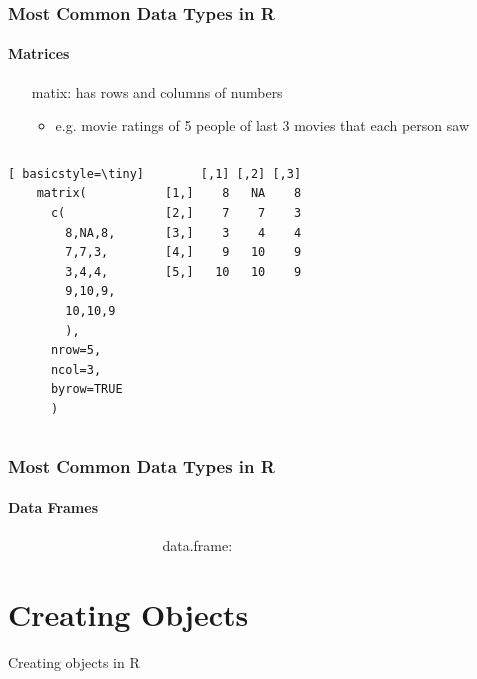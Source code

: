 \begin{frame}[fragile]
	\frametitle{Most Common Data Types in R}
	\framesubtitle{Matrices}

	\begin{itemize}
		\item[matix:] has rows and columns of numbers
			\begin{itemize}
				\item e.g. movie ratings of 5 people of last 3 movies that each person saw 
			\end{itemize}
		\end{itemize}

   \begin{columns}
     	\begin{center}
		\begin{lstlisting}[ basicstyle=\tiny]
	matrix(
	  c(
	    8,NA,8,
	    7,7,3,
		3,4,4,
		9,10,9,
		10,10,9
		),
	  nrow=5,
	  ncol=3,
	  byrow=TRUE
	  )
		\end{lstlisting}
     	\end{center}
      \begin{center}
{ \small
				\begin{verbatim} 
     [,1] [,2] [,3]
[1,]    8   NA    8
[2,]    7    7    3
[3,]    3    4    4
[4,]    9   10    9
[5,]   10   10    9
			\end{verbatim} \normalsize
}
       \end{center}
     \end{columns}
\end{frame}


\begin{frame}[fragile]
	\frametitle{Most Common Data Types in R}
	\framesubtitle{Data Frames}

	\begin{itemize}
		\item[$\quad \quad \quad \quad \quad \quad \quad \quad \quad$ data.frame:]
	\end{itemize}

\end{frame}

\section[Assignment]{Creating Objects}
\begin{frame}
	\begin{center}
		\begin{block}{Creating objects in R}

		\end{block}
	\end{center} 
\end{frame}


